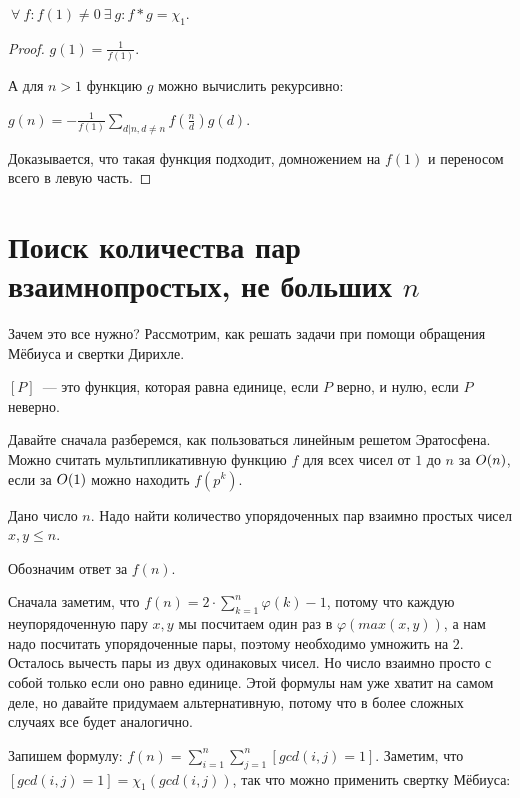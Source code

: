 \begin{theorem}
    $\ \forall \ f : f(1) \neq 0 \ \exists \ g : f * g = \chi_1$.
\end{theorem}

\begin{proof}
    $g(1) = \frac{1}{f(1)}$.

    А для $n > 1$ функцию $g$ можно вычислить рекурсивно:
    
    $g(n) = -\frac{1}{f(1)} \sum \limits_{d | n, d \neq n} f(\frac{n}{d}) g(d)$.

    Доказывается, что такая функция подходит, домножением на $f(1)$ и переносом всего в левую часть.
\end{proof}

\section{Поиск количества пар взаимнопростых, не больших $n$}

Зачем это все нужно?
Рассмотрим, как решать задачи при помощи обращения Мёбиуса и свертки Дирихле.

\begin{designation}
    $[P]$~--- это функция, которая равна единице, если $P$ верно, и нулю, если $P$ неверно.
\end{designation}

Давайте сначала разберемся, как пользоваться линейным решетом Эратосфена.
Можно считать мультипликативную функцию $f$ для всех чисел от $1$ до $n$ за $O(n)$, если за $O(1)$ можно находить $f(p^k)$.

\begin{example}
    Дано число $n$. Надо найти количество упорядоченных пар взаимно простых чисел $x, y \le n$.
\end{example}

Обозначим ответ за $f(n)$.

Сначала заметим, что  $f(n) = 2 \cdot \sum \limits_{k = 1}^{n} \varphi(k) - 1$, потому что каждую неупорядоченную пару
$x, y$ мы посчитаем один раз в $\varphi(max(x, y))$, а нам надо посчитать упорядоченные пары, поэтому необходимо умножить на $2$. Осталось вычесть
пары из двух одинаковых чисел. Но число взаимно просто с собой только если оно равно единице. Этой формулы нам уже хватит на самом деле, но давайте придумаем альтернативную, потому что в более сложных случаях все будет аналогично.

Запишем формулу: $f(n) = \sum \limits_{i = 1}^{n} \sum \limits_{j = 1}^{n} [gcd(i, j) = 1]$.
Заметим, что $[gcd(i, j) = 1] = \chi_1(gcd(i, j))$, так что можно применить свертку Мёбиуса:


